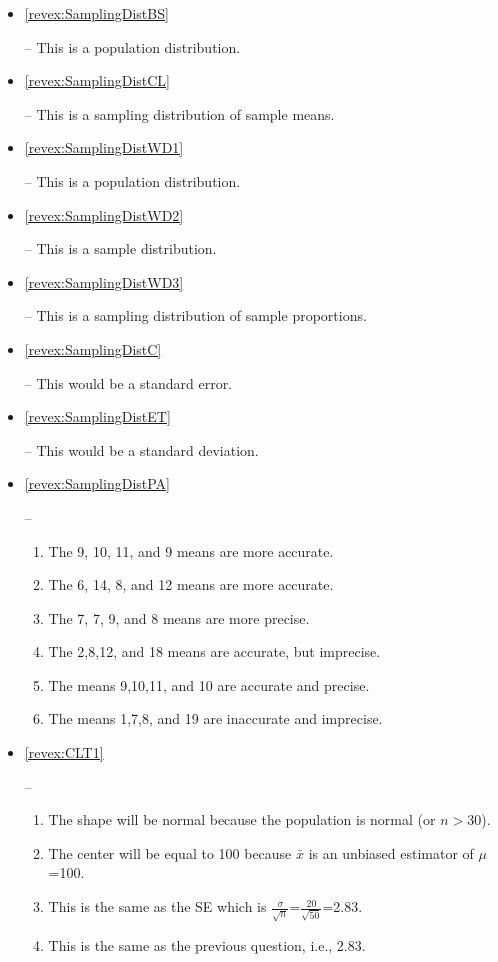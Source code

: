 \documentclass[10pt,openany]{book}\usepackage[]{graphicx}\usepackage[]{color}
\begin{document}
\begin{itemize}
  \item \hypertarget{ans:SamplingDistBS}{\ref{revex:SamplingDistBS}} -- This is a population distribution.
  \item \hypertarget{ans:SamplingDistCL}{\ref{revex:SamplingDistCL}} -- This is a sampling distribution of sample means.
  \item \hypertarget{ans:SamplingDistWD1}{\ref{revex:SamplingDistWD1}} -- This is a population distribution.
  \item \hypertarget{ans:SamplingDistWD2}{\ref{revex:SamplingDistWD2}} -- This is a sample distribution.
  \item \hypertarget{ans:SamplingDistWD3}{\ref{revex:SamplingDistWD3}} -- This is a sampling distribution of sample proportions.
  \item \hypertarget{ans:SamplingDistC}{\ref{revex:SamplingDistC}} -- This would be a standard error.
  \item \hypertarget{ans:SamplingDistET}{\ref{revex:SamplingDistET}} -- This would be a standard deviation.
  \item \hypertarget{ans:SamplingDistPA}{\ref{revex:SamplingDistPA}} --
  \begin{enumerate}
    \item The 9, 10, 11, and 9 means are more accurate.
    \item The 6, 14, 8, and 12 means are more accurate.
    \item The 7, 7, 9, and 8 means are more precise.
    \item The 2,8,12, and 18 means are accurate, but imprecise.
    \item The means 9,10,11, and 10 are accurate and precise.
    \item The means 1,7,8, and 19 are inaccurate and imprecise.
  \end{enumerate}
  \item \hypertarget{ans:CLT1}{\ref{revex:CLT1}} --
  \begin{enumerate}
    \item The shape will be normal because the population is normal (or $n>30$).
    \item The center will be equal to 100 because $\bar{x}$ is an unbiased estimator of $\mu$=100.
    \item This is the same as the SE which is $\frac{\sigma}{\sqrt{n}}$=$\frac{20}{\sqrt{50}}$=2.83.
    \item This is the same as the previous question, i.e., 2.83.
  \end{enumerate}

\end{itemize}
\end{document}
